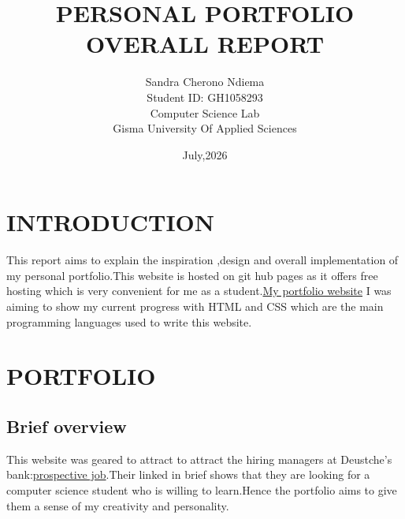 \documentclass[12pt]{article}
\title{PERSONAL PORTFOLIO OVERALL REPORT}
\author{Sandra Cherono Ndiema\\
\AND
Student ID: GH1058293\\
\AND
\AND
\AND
\AND
	Computer Science Lab\\
\AND
	Gisma University Of Applied Sciences\\
}
\date{July,2026}
\begin{document}
\maketitle

\newpage
\tableofcontents
\thispagestyle{empty}

\newpage
\setcounter{page}{1}
\section{INTRODUCTION}
This report aims to explain the inspiration ,design and overall implementation of my personal portfolio.This website is hosted on git hub pages as it offers free hosting which is very convenient for me as a student.\href{https://ndiemasandra.github.io/personalportfolio/}{My portfolio website}
I was aiming to show my current progress with HTML and CSS which are the main programming languages used to write this website.
 


\section{PORTFOLIO}
\subsection{Brief overview}
This website was geared to attract to attract the hiring managers at Deustche's bank:\href{https://www.linkedin.com/jobs/view/4338103919}{prospective job}.Their linked in brief shows that they are looking for a computer science student who is willing to learn.Hence the portfolio aims to give them a sense of my creativity and personality.
\label{sec:headings}
\end{document}
